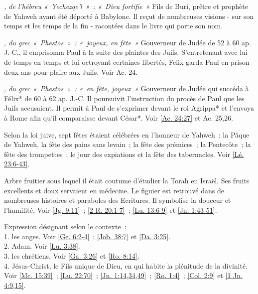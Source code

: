 \begin{multicols}{2}
\textit{, de l'hébreu «~Yechezqe'l~»~: «~Dieu fortifie~»}\newline
Fils de Buri, prêtre et prophète de Yahweh ayant été déporté à Babylone. Il reçut de nombreuses visions - sur son temps et les temps de la fin - racontées dans le livre qui porte son nom.

\textit{, du grec «~Phestos~»~: «~joyeux, en fête~»}\newline
Gouverneur de Judée de 52 à 60 ap. J.-C., il emprisonna Paul à la suite des plaintes des Juifs. S'entretenant avec lui de temps en temps et lui octroyant certaines libertés, Felix garda Paul en prison deux ans pour plaire aux Juifs. Voir Ac. 24.

\textit{, du grec «~Phestos~»~: «~en fête, joyeux~»}\newline
Gouverneur de Judée qui succéda à Félix* de 60 à 62 ap. J.-C. Il poursuivit l'instruction du procès de Paul que les Juifs accusaient. Il permit à Paul de s'exprimer devant le roi Agrippa* et l'envoya à Rome afin qu'il comparaisse devant César*. Voir \vref{Ac. 24:27} et Ac. 25,26.

\textit{}\newline
Selon la loi juive, sept fêtes étaient célébrées en l'honneur de Yahweh~: la Pâque de Yahweh, la fête des pains sans levain~; la fête des prémices~; la Pentecôte~; la fête des trompettes~; le jour des expiations et la fête des tabernacles. Voir \vref{Lé. 23:6-43}.

\textit{}\newline
Arbre fruitier sous lequel il était coutume d'étudier la Torah en Israël. Ses fruits excellents et doux servaient en médecine. Le figuier est retrouvé dans de nombreuses histoires et paraboles des Ecritures. Il symbolise la douceur et l'humilité. Voir \vref{Jg. 9:11}~; \vref{2 R. 20:1-7}~; \vref{Lu. 13:6-9} et \vref{Jn. 1:43-51}.

\textit{}\newline
Expression désignant selon le contexte~:
\\1. les anges. Voir \vref{Ge. 6:2-4}~; \vref{Job. 38:7} et \vref{Da. 3:25}.
\\2. Adam. Voir \vref{Lu. 3:38}.
\\3. les chrétiens. Voir \vref{Ga. 3:26} et \vref{Ro. 8:14}.
\\4. Jésus-Christ, le Fils unique de Dieu, en qui habite la plénitude de la divinité. Voir \vref{Mc. 15:39}~; \vref{Lu. 22:70}~; \vref{Jn. 1:14,34,49}~; \vref{Ro. 1:4}~; \vref{Col. 2:9} et \vref{1 Jn. 4:9,15}.


\end{multicols}
